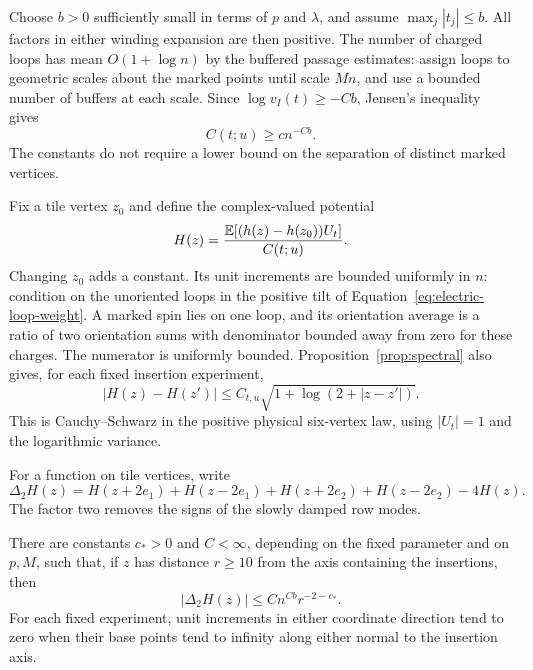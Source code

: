 Choose $b>0$ sufficiently small in terms of $p$ and $\lambda$, and
assume $\max_j|t_j|\le b$.  All factors in either winding
expansion are then positive.  The number of charged loops has mean
$O(1+\log n)$ by the buffered passage estimates: assign loops to
geometric scales about the marked points until scale $Mn$, and use
a bounded number of buffers at each scale.  Since
$\log v_I(t)\ge-Cb$, Jensen's inequality gives
\begin{equation}\label{eq:small-charge-lower-bound}
 C(t;u)\ge c n^{-Cb}.
\end{equation}
The constants do not require a lower bound on the separation of
distinct marked vertices.

Fix a tile vertex $z_0$ and define the complex-valued potential
\begin{equation}\label{eq:electric-potential}
 H(z)=\frac{\mathbb E[(h(z)-h(z_0))U_t]}{C(t;u)}.
\end{equation}
Changing $z_0$ adds a constant.  Its unit increments are bounded
uniformly in $n$: condition on the unoriented loops in the positive
tilt of Equation~\eqref{eq:electric-loop-weight}.  A marked spin
lies on one loop, and its orientation average is a ratio of two
orientation sums with denominator bounded away from zero for these
charges.  The numerator is uniformly bounded.  Proposition~\ref{prop:spectral}
also gives, for each fixed insertion experiment,
\begin{equation}\label{eq:potential-growth}
 |H(z)-H(z')|\le C_{t,u}\sqrt{1+\log(2+|z-z'|)}.
\end{equation}
This is Cauchy--Schwarz in the positive physical six-vertex law,
using $|U_t|=1$ and the logarithmic variance.

For a function on tile vertices, write
\[
 \Delta_2H(z)=H(z+2e_1)+H(z-2e_1)
             +H(z+2e_2)+H(z-2e_2)-4H(z).
\]
The factor two removes the signs of the slowly damped row modes.

\begin{lemma}\label{lem:off-axis}
There are constants $c_*>0$ and $C<\infty$, depending on the fixed
parameter and on $p,M$, such that, if $z$ has distance $r\ge10$
from the axis containing the insertions, then
\begin{equation}\label{eq:off-axis-laplacian}
 |\Delta_2H(z)|\le C n^{Cb}r^{-2-c_*}.
\end{equation}
For each fixed experiment, unit increments in either coordinate
direction tend to zero when their base points tend to infinity
along either normal to the insertion axis.
\end{lemma}

